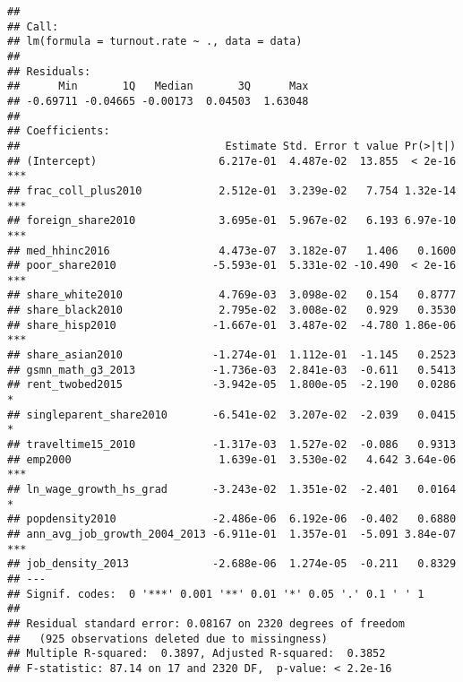 \documentclass[
]{article}
\begin{document}
\begin{verbatim}
## 
## Call:
## lm(formula = turnout.rate ~ ., data = data)
## 
## Residuals:
##      Min       1Q   Median       3Q      Max 
## -0.69711 -0.04665 -0.00173  0.04503  1.63048 
## 
## Coefficients:
##                                Estimate Std. Error t value Pr(>|t|)    
## (Intercept)                   6.217e-01  4.487e-02  13.855  < 2e-16 ***
## frac_coll_plus2010            2.512e-01  3.239e-02   7.754 1.32e-14 ***
## foreign_share2010             3.695e-01  5.967e-02   6.193 6.97e-10 ***
## med_hhinc2016                 4.473e-07  3.182e-07   1.406   0.1600    
## poor_share2010               -5.593e-01  5.331e-02 -10.490  < 2e-16 ***
## share_white2010               4.769e-03  3.098e-02   0.154   0.8777    
## share_black2010               2.795e-02  3.008e-02   0.929   0.3530    
## share_hisp2010               -1.667e-01  3.487e-02  -4.780 1.86e-06 ***
## share_asian2010              -1.274e-01  1.112e-01  -1.145   0.2523    
## gsmn_math_g3_2013            -1.736e-03  2.841e-03  -0.611   0.5413    
## rent_twobed2015              -3.942e-05  1.800e-05  -2.190   0.0286 *  
## singleparent_share2010       -6.541e-02  3.207e-02  -2.039   0.0415 *  
## traveltime15_2010            -1.317e-03  1.527e-02  -0.086   0.9313    
## emp2000                       1.639e-01  3.530e-02   4.642 3.64e-06 ***
## ln_wage_growth_hs_grad       -3.243e-02  1.351e-02  -2.401   0.0164 *  
## popdensity2010               -2.486e-06  6.192e-06  -0.402   0.6880    
## ann_avg_job_growth_2004_2013 -6.911e-01  1.357e-01  -5.091 3.84e-07 ***
## job_density_2013             -2.688e-06  1.274e-05  -0.211   0.8329    
## ---
## Signif. codes:  0 '***' 0.001 '**' 0.01 '*' 0.05 '.' 0.1 ' ' 1
## 
## Residual standard error: 0.08167 on 2320 degrees of freedom
##   (925 observations deleted due to missingness)
## Multiple R-squared:  0.3897, Adjusted R-squared:  0.3852 
## F-statistic: 87.14 on 17 and 2320 DF,  p-value: < 2.2e-16
\end{verbatim}
\end{document}
